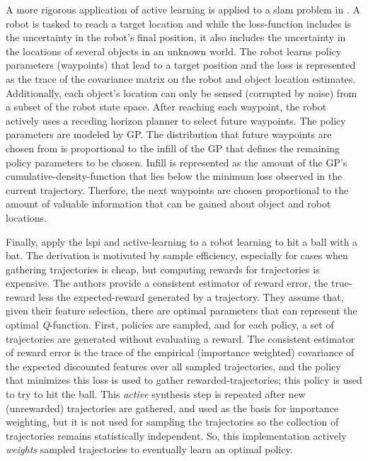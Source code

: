     A more rigorous application of active learning is applied to a \ac{slam} problem in \cite{martinez2007active}. A
    robot is tasked to reach a target location and while the loss-function includes is the uncertainty in the robot's
    final position, it also includes the uncertainty in the locations of several objects in an unknown world. The robot
    learns policy parameters (waypoints) that lead to a target position and the loss is represented as the trace of the
    covariance matrix on the robot and object location estimates. Additionally, each object's location can only be
    sensed (corrupted by noise) from a subset of the robot state space. After reaching each waypoint, the robot actively
    uses a receding horizon planner to select future waypoints. The policy parameters are modeled by \acf{GP}. The
    distribution that future waypoints are chosen from is proportional to the infill of the \ac{GP} that defines the
    remaining policy parameters to be chosen. Infill is represented as the amount of the \ac{GP}'s
    cumulative-density-function that lies below the minimum loss observed in the current trajectory. Therfore, the next
    waypoints are chosen proportional to the amount of valuable information that can be gained about object and robot
    locations.

    Finally, \cite{akiyama2010efficient} apply the \ac{lspi} and active-learning to a robot learning to hit a ball with
    a bat. The derivation is motivated by sample efficiency, especially for cases when gathering trajectories is cheap,
    but computing rewards for trajectories is expensive. The authors provide a consistent estimator of reward error, the
    true-reward less the expected-reward generated by a trajectory. They assume that, given their feature selection,
    there are optimal parameters that can represent the optimal \emph{Q}-function. First, policies are sampled, and for
    each policy, a set of trajectories are generated without evaluating a reward. The consistent estimator of reward
    error is the trace of the empirical (importance weighted) covariance of the expected discounted features over all
    sampled trajectories, and the policy that minimizes this loss is used to gather rewarded-trajectories; this policy
    is used to try to hit the ball. This \emph{active} synthesis step is repeated after new (unrewarded) trajectories
    are gathered, and used as the basis for importance weighting, but it is not used for sampling the trajectories so
    the collection of trajectories remains statistically independent. So, this implementation actively \emph{weights}
    sampled trajectories to eventually learn an optimal policy.

